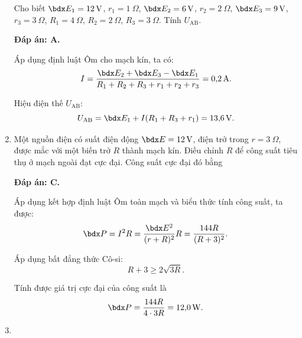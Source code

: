 \begin{enumerate}[label=\bfseries Câu \arabic*:]
{	Cho biết $\calE_1 = \SI{12}{V}$, $r_1=\SI{1}{\Omega}$, $\calE_2 = \SI{6}{V}$, $r_2=\SI{2}{\Omega}$, $\calE_3 = \SI{9}{V}$, $r_3=\SI{3}{\Omega}$, $R_1=\SI{4}{\Omega}$, $R_2=\SI{2}{\Omega}$, $R_3=\SI{3}{\Omega}$. Tính $U_\text{AB}$.
		
	}
	\loigiai
	{	\textbf{Đáp án: A.}
		
		Áp dụng định luật Ôm cho mạch kín, ta có:
		$$I=\dfrac{\calE_2 + \calE_3 - \calE_1}{R_1 + R_2 + R_3 + r_1 + r_2 + r_3} = \SI{0.2}{A}.$$
		
		Hiệu điện thế $U_\text{AB}$:
		$$U_\text{AB} = \calE_1 + I(R_1 + R_3 + r_1) = \SI{13.6}{V}.$$
	}
	\item {}
	
	\cauhoi
	{Một nguồn điện có suất điện động $\calE = \SI{12}{V}$, điện trở trong $r=\SI{3}{\Omega}$, được mắc với một biến trở $R$ thành mạch kín. Điều chỉnh $R$ để công suất tiêu thụ ở mạch ngoài đạt cực đại. Công suất cực đại đó bằng
		
	}
	\loigiai
	{	\textbf{Đáp án: C.}
		
		Áp dụng kết hợp định luật Ôm toàn mạch và biểu thức tính công suất, ta được:
		$$\calP = I^2 R = \dfrac{\calE ^2}{(r+R)^2} R = \dfrac{144 R}{(R+3)^2}.$$
		
		Áp dụng bất đẳng thức Cô-si:
		$$R+3 \geq 2 \sqrt{3 R}.$$
		
		Tính được giá trị cực đại của công suất là
		$$\calP = \dfrac{144 R}{4 \cdot 3R} = \SI{12.0}{W}.$$
	}
	\item {}
	

\end{enumerate}
